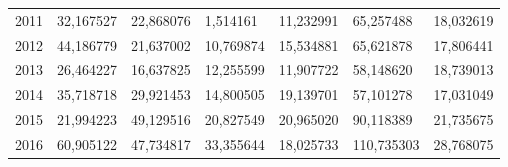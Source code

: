 \begin{table}
\begin{tabular}{p{1cm}p{2cm}p{2cm}p{2cm}p{2cm}p{2cm}p{2cm}}
 2011 &        32,167527 &                                          22,868076 &             1,514161 & 11,232991 &                      65,257488 &         18,032619 \\
 2012 &        44,186779 &                                          21,637002 &            10,769874 & 15,534881 &                      65,621878 &         17,806441 \\
 2013 &        26,464227 &                                          16,637825 &            12,255599 & 11,907722 &                      58,148620 &         18,739013 \\
 2014 &        35,718718 &                                          29,921453 &            14,800505 & 19,139701 &                      57,101278 &         17,031049 \\
 2015 &        21,994223 &                                          49,129516 &            20,827549 & 20,965020 &                      90,118389 &         21,735675 \\
 2016 &        60,905122 &                                          47,734817 &            33,355644 & 18,025733 &                     110,735303 &         28,768075 \\
\bottomrule
\end{tabular}
\end{table}
